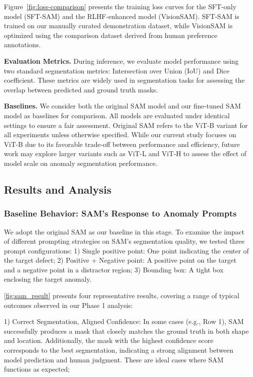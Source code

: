 \documentclass[11pt]{article}
\begin{document}
Figure~\ref{fig:loss-comparison} presents the training loss curves for the SFT-only model (SFT-SAM) and the RLHF-enhanced model (VisionSAM). SFT-SAM is trained on our manually curated demonstration dataset, while VisionSAM is optimized using the comparison dataset derived from human preference annotations.

\textbf{Evaluation Metrics.} During inference, we evaluate model performance using two standard segmentation metrics: Intersection over Union (IoU) and Dice coefficient. These metrics are widely used in segmentation tasks for assessing the overlap between predicted and ground truth masks.

\textbf{Baselines.} We consider both the original SAM model and our fine-tuned SAM model as baselines for comparison. All models are evaluated under identical settings to ensure a fair assessment. Original SAM refers to the ViT-B variant for all experiments unless otherwise specified. While our current study focuses on ViT-B due to its favorable trade-off between performance and efficiency, future work may explore larger variants such as ViT-L and ViT-H to assess the effect of model scale on anomaly segmentation performance.



\subsection{Results and Analysis}
\subsubsection{Baseline Behavior: SAM’s Response to Anomaly Prompts}

We adopt the original SAM as our baseline in this stage. To examine the impact of different prompting strategies on SAM’s segmentation quality, we tested three prompt configurations: 1) Single positive point: One point indicating the center of the target defect; 2) Positive + Negative point: A positive point on the target and a negative point in a distractor region; 3) Bounding box: A tight box enclosing the target anomaly.

\autoref{fig:sam_result} presents four representative results, covering a range of typical outcomes observed in our Phase 1 analysis: 

1) Correct Segmentation, Aligned Confidence: In some cases (e.g., Row 1), SAM successfully produces a mask that closely matches the ground truth in both shape and location. Additionally, the mask with the highest confidence score corresponds to the best segmentation, indicating a strong alignment between model prediction and human judgment. These are ideal cases where SAM functions as expected; 
\end{document}
